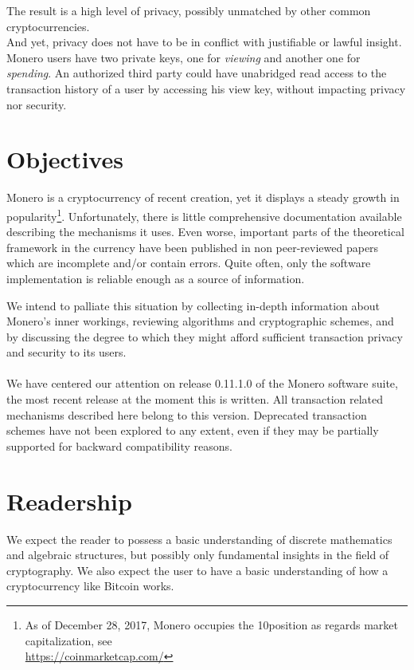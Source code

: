 The result is a high level of privacy, possibly unmatched by other common cryptocurrencies.
\\

And yet, privacy does not have to be in conflict with justifiable or lawful insight.
Monero users have two private keys, one for {\em viewing} and another one for {\em spending}. 
An authorized third party
could have unabridged read access to the transaction history of a user by accessing his view key,
without impacting privacy nor security.





\section{Objectives}
\label{sec:goals}

Monero is a cryptocurrency of recent creation, yet it displays a steady growth in popularity\footnote{
As of December 28\nth, 2017, Monero occupies the 10\nth position as regards market capitalization, see\\ \url{https://coinmarketcap.com/}}. 
Unfortunately, there is little comprehensive documentation available describing the mechanisms it uses. 
Even worse, important parts of the theoretical framework in the currency have been published
in non peer-reviewed papers which are incomplete and/or contain errors.
Quite often, only the software implementation is reliable enough as a source of information.
  
We intend to palliate this situation by collecting in-depth information about Monero's inner workings, 
reviewing algorithms and cryptographic schemes, and by discussing the degree to which they might afford sufficient 
transaction privacy and security to its users.
\\ 
\\ 

We have centered our attention on release 0.11.1.0 of the Monero software suite,
the most recent release at the moment this is written.
All transaction related mechanisms described here belong to this version. 
Deprecated transaction schemes have not been explored to any extent, even if they may
be partially supported for backward compatibility reasons.


\section{Readership}

We expect the reader to possess a basic understanding of discrete mathematics and algebraic structures, but possibly only
fundamental insights in the field of cryptography.
We also expect the user to have a basic understanding of how a cryptocurrency like Bitcoin works.

